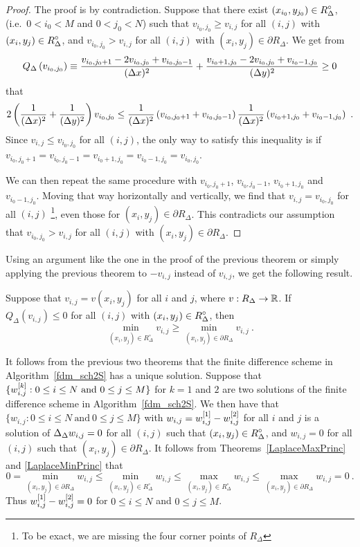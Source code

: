 \begin{proof}
The proof is by contradiction.  Suppose that there exist
$\displaystyle (x_{i_0},y_{j_0}) \in R^\circ_\Delta$, (i.e.\ $0 < i_0 < M$
and $0 < j_0 < N$) such that $v_{i_0,j_0} \geq v_{i,j}$ for all
$(i,j)$ with $\displaystyle (x_i,y_j) \in R^\circ_\Delta$, and
$v_{i_0,j_0} > v_{i,j}$ for all $(i,j)$ with
$(x_i,y_j) \in \partial R_\Delta$.  We get from
\[
Q_\Delta\left(v_{i_0,j_0}\right)
\equiv \frac{v_{i_0,j_0+1} - 2v_{i_0,j_0} + v_{i_0,j_0-1}}{(\Delta{x})^2}
+ \frac{v_{i_0+1,j_0} - 2v_{i_0,j_0} + v_{i_0-1,j_0}}{(\Delta{y})^2}
\geq 0
\]
that
\[
2\left( \frac{1}{(\dtx{x})^2} + \frac{1}{(\dtx{y})^2} \right) v_{i_0,j_0} \\
\leq \frac{1}{(\dtx{x})^2} \left( v_{i_0,j_0+1} + v_{i_0,j_0-1} \right)
\frac{1}{(\dtx{x})^2} \left( v_{i_0+1,j_0} + v_{i_0-1,j_0} \right) \ .
\]
Since $v_{i,j} \leq v_{i_0,j_0}$ for all $(i,j)$, the only way to satisfy this
inequality is if
$v_{i_0,j_0+1}= v_{i_0,j_0-1} = v_{i_0+1,j_0} = v_{i_0-1,j_0} = v_{i_0,j_0}$.

We can then repeat the same procedure with $v_{i_0,j_0+1}$,
$v_{i_0,j_0-1}$, $v_{i_0+1,j_0}$ and $v_{i_0-1,j_0}$.  Moving that way
horizontally and vertically, we find that $v_{i,j} = v_{i_0,j_0}$ for all
$(i,j)$ \footnote{To be exact, we are missing the four corner points
of $R_\Delta$}, even those for $(x_i,y_j) \in \partial R_\Delta$.  This
contradicts our assumption that
$v_{i_0,j_0} > v_{i,j}$ for all $(i,j)$ with
$(x_i,y_j) \in \partial R_\Delta$.
\end{proof}

Using an argument like the one in the proof of the previous
theorem or simply applying the previous theorem to
$-v_{i,j}$ instead of $v_{i,j}$, we get the following result.

\begin{theorem} \label{LaplaceMinPrinc}
Suppose that $v_{i,j} = v(x_i,y_j)$ for all $i$ and $j$, where
$v:R_\Delta \to \mathbb{R}$.  If $Q_\Delta(v_{i,j}) \leq 0$ for all $(i,j)$ with
$\displaystyle (x_i,y_j)\in R^\circ_\Delta$, then
\[
  \min_{(x_i,y_j) \in R^\circ_\Delta} v_{i,j}
  \geq \min_{(x_i,y_j) \in \partial R_\Delta} v_{i,j} \ .
\]  
\end{theorem}

It follows from the previous two theorems that the finite
difference scheme in Algorithm~\ref{fdm_sch2S} has a unique solution.
Suppose that
$\displaystyle \{ w_{i,j}^{[k]} : 0\leq i \leq N \ \text{and} \ 0 \leq j
\leq M\}$
for $k=1$ and $2$ are two solutions of the finite
difference scheme in Algorithm~\ref{fdm_sch2S}.  We then have that
$\{ w_{i,j} : 0\leq i \leq N \ \text{and} \ 0 \leq j \leq M\}$
with $\displaystyle w_{i,j} = w_{i,j}^{[1]} - w_{i,j}^{[2]}$ for all
$i$ and $j$ is
a solution of $\displaystyle \Delta_\Delta w_{i,j} = 0$ for all $(i,j)$
such that $\displaystyle (x_i,y_j) \in R^\circ_\Delta$, and $w_{i,j} = 0$
for all 
$(i,j)$ such that $(x_i,y_j) \in \partial R_\Delta$.  It follows from
Theorems~\ref{LaplaceMaxPrinc} and \ref{LaplaceMinPrinc} that
\[
0 = \min_{(x_i,y_j) \in \partial R_\Delta} w_{i,j}
\leq \min_{(x_i,y_j) \in R^\circ_\Delta} w_{i,j}
\leq \max_{(x_i,y_j) \in R^\circ_\Delta} w_{i,j}
\leq \max_{(x_i,y_j) \in \partial R_\Delta} w_{i,j} = 0 \ .
\]
Thus $\displaystyle w_{i,j}^{[1]} - w_{i,j}^{[2]} = 0$ for $0\leq i \leq N$ and
$0\leq j \leq M$.

